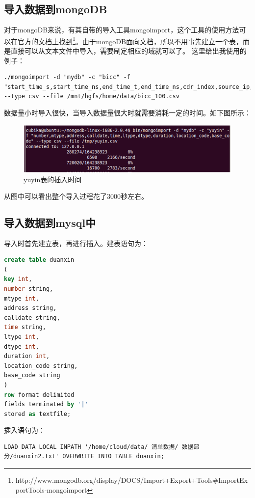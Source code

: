 \subsection{导入数据到mongoDB}
对于mongoDB来说，有其自带的导入工具mongoimport，这个工具的使用方法可以在官方的文档上找到\footnote{http://www.mongodb.org/display/DOCS/Import+Export+Tools\#ImportExportTools-mongoimport}。由于mongoDB面向文档，所以不用事先建立一个表，而是直接可以从文本文件中导入，需要制定相应的域就可以了。
这里给出我使用的例子：
\begin{lstlisting}
./mongoimport -d "mydb" -c "bicc" -f "start_time_s,start_time_ns,end_time_t,end_time_ns,cdr_index,source_ip,destination_ip,cic,opc,dpc,release_reason,calling_number,called_number,original_called_number,transfer_number,location_number,response_time,acm_time,anm_time,rel_time,call_duration,codec_modify_flag,codec_modify_result,codec_negotiation_flag,codec_negotiation_result,codec_type,call_type,is_ext_platform,call_hold,call_forward,call_waiting,conference_call" --type csv --file /mnt/hgfs/home/data/bicc_100.csv
\end{lstlisting}
数据量小时导入很快，当导入数据量很大时就需要消耗一定的时间。如下图所示：
\begin{figure}[!ht]
\centering
\includegraphics[]{photo/mongoimport.png} 
\caption{yuyin表的插入时间}
\end{figure} 
从图中可以看出整个导入过程花了3000秒左右。

\subsection{导入数据到mysql中}
导入时首先建立表，再进行插入。建表语句为：
\begin{lstlisting}[language=SQL]
create table duanxin
(
key int,
number string,
mtype int,
address string,
calldate string,
time string,
ltype int,
dtype int,
duration int,
location_code string,
base_code string
)
row format delimited 
fields terminated by '|'
stored as textfile;
\end{lstlisting}

插入语句为：
\begin{lstlisting}
LOAD DATA LOCAL INPATH '/home/cloud/data/ 清单数据/ 数据部分/duanxin2.txt' OVERWRITE INTO TABLE duanxin;
\end{lstlisting}